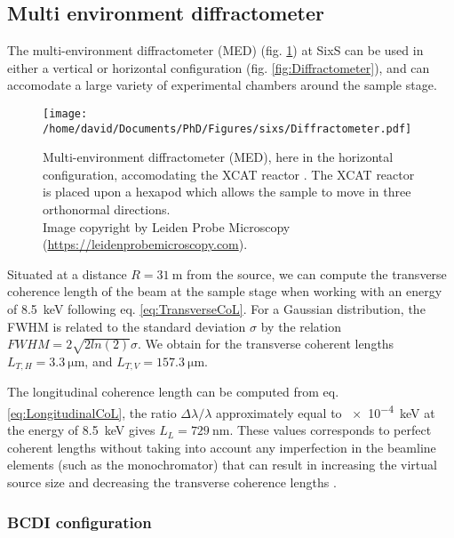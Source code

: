 \subsection{Multi environment diffractometer}\label{sec:MED}

The multi-environment diffractometer (MED) (fig. \ref{fig:MEDDiffractometer}) at SixS can be used in either a vertical or horizontal configuration (fig. \ref{fig:Diffractometer}), and can accomodate a large variety of experimental chambers around the sample stage.

\begin{figure}[!htb]
    \centering
    \texttt{[image: /home/david/Documents/PhD/Figures/sixs/Diffractometer.pdf]}
    \caption{
        Multi-environment diffractometer (MED), here in the horizontal configuration, accomodating the XCAT reactor \parencite{VanRijn2010}.
        The XCAT reactor is placed upon a hexapod which allows the sample to move in three orthonormal directions.\\
        Image copyright by Leiden Probe Microscopy (\url{https://leidenprobemicroscopy.com}).
    }
    \label{fig:MEDDiffractometer}
\end{figure}

Situated at a distance $R = \qty{31}{\m}$ from the source, we can compute the transverse coherence length of the beam at the sample stage when working with an energy of \qty{8.5}{\keV} following eq. \ref{eq:TransverseCoL}.
For a Gaussian distribution, the FWHM is related to the standard deviation $\sigma$ by the relation $FWHM = 2\sqrt{2 ln (2) } \sigma$.
We obtain for the transverse coherent lengths $L_{T,H} = \qty{3.3}{\um}$, and $L_{T,V} = \qty{157.3}{\um}$.

The longitudinal coherence length can be computed from eq. \ref{eq:LongitudinalCoL}, the ratio $\Delta\lambda/\lambda$ approximately equal to \qty{e-4}{\keV} at the energy of \qty{8.5}{\keV} gives $L_L = \qty{729}{\nm}$.
These values corresponds to perfect coherent lengths without taking into account any imperfection in the beamline elements (such as the monochromator) that can result in increasing the virtual source size and decreasing the transverse coherence lengths \parencite{vincentjacques2010}.

\subsubsection{BCDI configuration}

